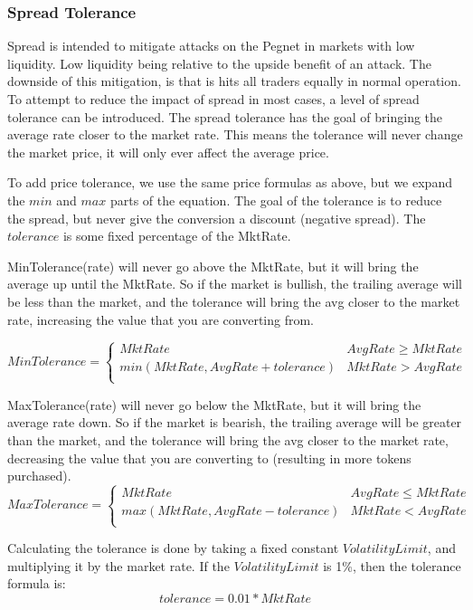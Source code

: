 \documentclass[12pt]{article}
\begin{document}
    \pagebreak
    \subsubsection{Spread Tolerance}
    
    Spread is intended to mitigate attacks on the Pegnet in markets with low liquidity. Low liquidity being relative to the upside benefit of an attack. The downside of this mitigation, is that is hits all traders equally in normal operation. To attempt to reduce the impact of spread in most cases, a level of spread tolerance can be introduced. The spread tolerance has the goal of bringing the average rate closer to the market rate. This means the tolerance will never change the market price, it will only ever affect the average price.
    
    To add price tolerance, we use the same price formulas as above, but we expand the $min$ and $max$ parts of the equation. The goal of the tolerance is to reduce the spread, but never give the conversion a discount (negative spread). The $tolerance$ is some fixed percentage of the MktRate.
    
    MinTolerance(rate) will never go above the MktRate, but it will bring the average up until the MktRate. So if the market is bullish, the trailing average will be less than the market, and the tolerance will bring the avg closer to the market rate, increasing the value that you are converting from.
    
    
    \[ MinTolerance = \begin{cases} 
      MktRate & AvgRate \geq MktRate \\
      min(MktRate, AvgRate + tolerance) & MktRate > AvgRate \\
   \end{cases}
    \]
    
    MaxTolerance(rate) will never go below the MktRate, but it will bring the average rate down. So if the market is bearish, the trailing average will be greater than the market, and the tolerance will bring the avg closer to the market rate, decreasing the value that you are converting to (resulting in more tokens purchased).
    \[ MaxTolerance = \begin{cases} 
      MktRate & AvgRate \leq MktRate \\
      max(MktRate, AvgRate - tolerance) & MktRate < AvgRate \\
   \end{cases}
    \]
    
    Calculating the tolerance is done by taking a fixed constant $Volatility Limit$, and multiplying it by the market rate. If the $Volatility Limit$ is 1\%, then the tolerance formula is:
     \[ 
     tolerance = 0.01 * MktRate
    \]
  
\end{document}
